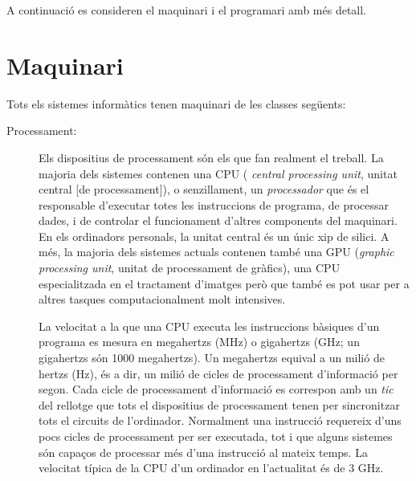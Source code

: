 A continuació es consideren el maquinari i el programari amb més
detall.

\section{Maquinari}

Tots els sistemes informàtics tenen maquinari de les classes següents:

\begin{description}
\item[Processament:] Els dispositius de processament són els que fan
  realment el treball. La majoria dels sistemes contenen una CPU ({\em
    central processing unit}, unitat central [de processament]), o
  senzillament, un \emph{processador} que és el responsable d'executar
  totes les instruccions de programa, de processar dades, i de
  controlar el funcionament d'altres components del maquinari. En els
  ordinadors personals, la unitat central és un únic xip de silici. A
  més, la majoria dels sistemes actuals contenen també una GPU
  (\emph{graphic processing unit}, unitat de processament de gràfics),
  una CPU especialitzada en el tractament d'imatges però que també es
  pot usar per a altres tasques computacionalment molt intensives.

  La velocitat a la que una CPU executa les instruccions bàsiques d'un
  programa es mesura en megahertzs (MHz) o gigahertzs (GHz; un
  gigahertzs són 1000 megahertzs). Un megahertzs equival a un milió de
  hertzs (Hz), és a dir, un milió de cicles de processament
  d'informació per segon. Cada cicle de processament d'informació es
  correspon amb un \emph{tic} del rellotge que tots el dispositius de
  processament tenen per sincronitzar tots el circuits de
  l'ordinador. Normalment una instrucció requereix d'uns pocs cicles
  de processament per ser executada, tot i que alguns sistemes són
  capaços de processar més d'una instrucció al mateix temps. La
  velocitat típica de la CPU d'un ordinador en l'actualitat és de 3
  GHz.
  

\end{description}
